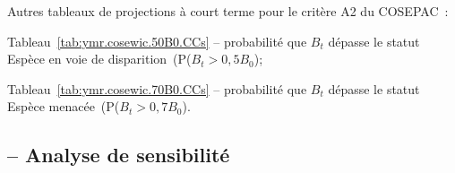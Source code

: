 \documentclass[11pt]{book}
\newcommand{\angL}{\guillemotleft\,}
\newcommand{\angR}{\,\guillemotright}
\newcommand{\pc}{\%}
\begin{document}
Autres tableaux de projections \`{a} court terme pour le crit\`{e}re A2 du COSEPAC~:
\begin{itemize_csas}{}{}
\item Tableau~\ref{tab:ymr.cosewic.50B0.CCs}  -- probabilit\'{e} que $B_t$ d\'{e}passe le statut \angL{}Esp\`{e}ce en voie de disparition\angR{} (P($B_t > 0,5B_0$);
\item Tableau~\ref{tab:ymr.cosewic.70B0.CCs}  -- probabilit\'{e} que $B_t$ d\'{e}passe le statut \angL{}Esp\`{e}ce menac\'{e}e\angR{} (P($B_t > 0,7B_0$).
\end{itemize_csas}


\subsection{\SPC{} -- Analyse de sensibilit\'{e}}\label{ss:sensruns} 
\end{document}
